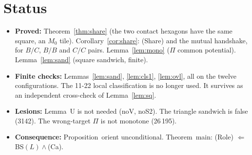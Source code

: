 \documentclass[11pt]{article}
\theoremstyle{definition}\newtheorem{definition}[theorem]{Definition}\newtheorem{remark}[theorem]{Remark}
\begin{document}
\section*{Status}
\begin{itemize}
\item \textbf{Proved:} Theorem~\ref{thm:share} (the two contact hexagons have the same square, an $M_0$ tile). Corollary~\ref{cor:share}: (Share) and the mutual handshake, for $B/C$, $B/B$ and $C/C$ pairs. Lemma~\ref{lem:mono} ($\Pi$ common potential). Lemma~\ref{lem:sand} (square sandwich, finite).
\item \textbf{Finite checks:} Lemmas~\ref{lem:sand}, \ref{lem:cls1}, \ref{lem:ovl}, all on the twelve configurations. The 11-22 local classification is no longer used. It survives as an independent cross-check of Lemma~\ref{lem:sq}.
\item \textbf{Lesions:} Lemma~U is not needed (noV, noS2). The triangle sandwich is false (3142). The wrong-target $\Pi$ is not monotone (26\,195).
\item \textbf{Consequence:} Proposition~orient unconditional. Theorem~main: (Role) $\Leftarrow$ BS$(L)\wedge$(Ca).
\end{itemize}
\end{document}
